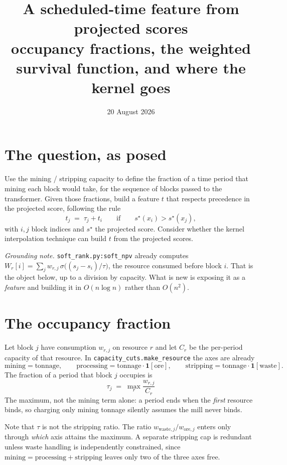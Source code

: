 \documentclass[11pt,a4paper]{article}
\title{\bfseries A scheduled-time feature from projected scores\\[2pt]
\large occupancy fractions, the weighted survival function, and where the kernel goes}
\author{}
\date{20 August 2026}
\newcommand{\ind}[1]{\mathbf{1}\!\left[#1\right]}
\newcommand{\sstar}{s^{\star}}
\theoremstyle{definition}
\begin{document}
\maketitle
\vspace{-2.5em}

\section*{The question, as posed}
\noindent Use the mining / stripping capacity to define the fraction of a time period that mining
each block would take, for the sequence of blocks passed to the transformer. Given those
fractions, build a feature $t$ that respects precedence in the projected score, following the rule
\[
  t_j \;=\; \tau_j + t_i \qquad\text{if}\qquad \sstar(x_i) > \sstar(x_j),
\]
with $i,j$ block indices and $\sstar$ the projected score. Consider whether the kernel
interpolation technique can build $t$ from the projected scores.

\medskip
\noindent\textit{Grounding note.} \texttt{soft\_rank.py:soft\_npv} already computes
$W_r[i]=\sum_j w_{r,j}\,\sigma\!\big((s_j-s_i)/\tau\big)$, the resource consumed before block $i$.
That is the object below, up to a division by capacity. What is new is exposing it as a
\emph{feature} and building it in $O(n\log n)$ rather than $O(n^2)$.

\section{The occupancy fraction}

Let block $j$ have consumption $w_{r,j}$ on resource $r$ and let $C_r$ be the per-period capacity
of that resource. In \texttt{capacity\_cuts.make\_resource} the axes are already
\[
  \text{mining} = \text{tonnage},\qquad
  \text{processing} = \text{tonnage}\cdot\ind{\text{ore}},\qquad
  \text{stripping} = \text{tonnage}\cdot\ind{\text{waste}} .
\]
The fraction of a period that block $j$ occupies is
\[
  \boxed{\;\tau_j \;=\; \max_r \frac{w_{r,j}}{C_r}\;}
\]
The maximum, not the mining term alone: a period ends when the \emph{first} resource binds, so
charging only mining tonnage silently assumes the mill never binds.

Note that $\tau$ is not the stripping ratio. The ratio $w_{\mathrm{waste},j}/w_{\mathrm{ore},j}$
enters only through \emph{which} axis attains the maximum. A separate stripping cap is redundant
unless waste handling is independently constrained, since
$\text{mining}=\text{processing}+\text{stripping}$ leaves only two of the three axes free.
\end{document}

